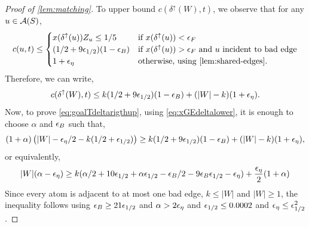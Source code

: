 \begin{proof}[Proof of \cref{lem:matching}]
 To upper bound $ c(\delta^\uparrow(W),t)$, we observe that for any $u\in{\cal A}(S)$, 
 $$c(u,t)\leq \begin{cases} x(\delta^\uparrow(u))Z_u\leq 1/5  & \text{if $x(\delta^\uparrow(u))< \eps_F$}\\
  (1/2+9\eps_{1/2})(1-\eps_B) & \text{if 
 $x(\delta^\uparrow(u))>\eps_F$ and $u$ incident to bad edge}	\\
 1 + \eps_\eta & \text{otherwise, using \cref{lem:shared-edges}.}
 \end{cases}
 $$
Therefore, we can write,
 $$ c(\delta^\uparrow(W),t) \leq k(1/2+9{\epsilon}_{1/2})(1-{\epsilon}_B) + (|W|-k)(1+{\epsilon}_{\eta}).$$
 Now, to prove \eqref{eq:goalTdeltarigthup}, using \eqref{eq:xGEdeltalower}, it is enough to choose $\alpha$ and ${\epsilon}_B$ such that,
 $$
 (1+\alpha) \left(|W| - {\epsilon}_{\eta}/2 - k(1/2+{\epsilon}_{1/2})\right) \geq k(1/2+9{\epsilon}_{1/2})(1-{\epsilon}_B) + (|W|-k)(1+{\epsilon}_{\eta}),
 $$
 or equivalently,
 $$ |W|(\alpha-{\epsilon}_{\eta}) \geq k (\alpha/2 + 10{\epsilon}_{1/2} + \alpha {\epsilon}_{1/2} -{\epsilon}_B/2 - 9{\epsilon}_B {\epsilon}_{1/2} -{\epsilon}_{\eta}) + \frac{{\epsilon}_{\eta}}{2}(1+\alpha)$$
Since  every atom is adjacent to at most one bad edge, $k\leq |W|$
and $|W|\ge 1$, the inequality follows using
${\epsilon}_B \ge  21 {\epsilon}_{1/2}$ and $\alpha > 2 {\epsilon}_\eta$ and ${\epsilon}_{1/2}\leq 0.0002$ and ${\epsilon}_\eta \leq {\epsilon}_{1/2}^2$.
\end{proof}

%
